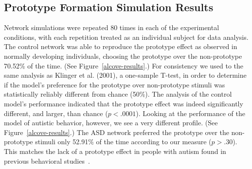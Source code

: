 
\subsection{Prototype Formation Simulation Results}

Network simulations were repeated 80 times in each of the experimental conditions, with each repetition treated as an individual subject for data analysis.  The control network was able to reproduce the prototype effect as observed in normally developing individuals, choosing the prototype over the non-prototype 70.52\% of the time.  (See Figure~\ref{alcove-results}.)  For consistency we used to the same analysis as Klinger et al. (2001), a one-sample T-test, in order to determine if the model's preference for the prototype over non-prototype stimuli was statistically reliably different from chance (50\%).  The analysis of the control model's performance indicated that the prototype effect was indeed significantly different, and larger, than chance ($p < .0001$).   Looking at the performance of the model of autistic behavior, however, we see a very different profile. (See Figure~\ref{alcove-results}.)  The ASD network preferred the prototype over the non-prototype stimuli only 52.91\% of the time according to our measure ($p > .30$).  This matches the lack of a prototype effect in people with autism found in previous behavioral studies~\cite{RefWorks:113,StraussMS:2009:Prototype}.

